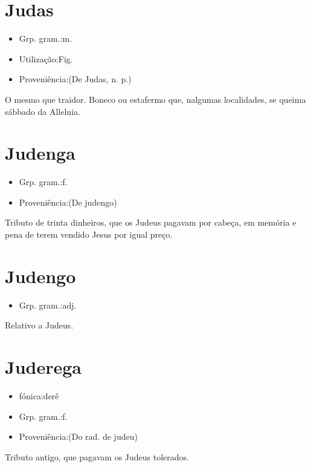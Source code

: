 \documentclass{article}
\begin{document}
\section{Judas}
\begin{itemize}
\item {Grp. gram.:m.}
\end{itemize}
\begin{itemize}
\item {Utilização:Fig.}
\end{itemize}
\begin{itemize}
\item {Proveniência:(De \textunderscore Judas\textunderscore , n. p.)}
\end{itemize}
O mesmo que \textunderscore traidor\textunderscore .
Boneco ou estafermo que, nalgumas localidades, se queima sábbado da Alleluia.
\section{Judenga}
\begin{itemize}
\item {Grp. gram.:f.}
\end{itemize}
\begin{itemize}
\item {Proveniência:(De \textunderscore judengo\textunderscore )}
\end{itemize}
Tributo de trinta dinheiros, que os Judeus pagavam por cabeça, em memória e pena de terem vendido Jesus por igual preço.
\section{Judengo}
\begin{itemize}
\item {Grp. gram.:adj.}
\end{itemize}
Relativo a Judeus.
\section{Juderega}
\begin{itemize}
\item {fónica:derê}
\end{itemize}
\begin{itemize}
\item {Grp. gram.:f.}
\end{itemize}
\begin{itemize}
\item {Proveniência:(Do rad. de \textunderscore judeu\textunderscore )}
\end{itemize}
Tributo antigo, que pagavam os Judeus tolerados.
\end{document}
